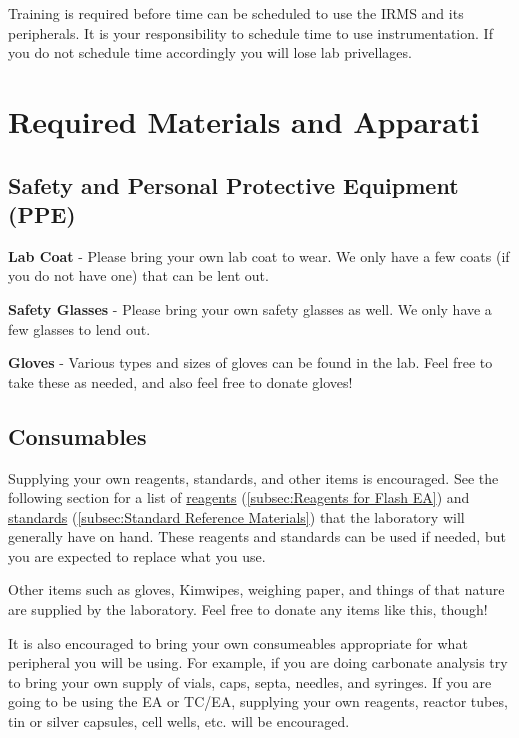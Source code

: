 \documentclass[12pt]{../SOP3}\usepackage[]{graphicx}\usepackage[]{color}
\begin{document}
\NP Training is required before time can be scheduled to use the IRMS and its peripherals. It is your responsibility to schedule time to use instrumentation. If you do not schedule time accordingly you will lose lab privellages.


\section{Required Materials and Apparati}

\subsection{Safety and Personal Protective Equipment (PPE)}

\NP \textbf{Lab Coat} - Please bring your own lab coat to wear. We only have a few coats (if you do not have one) that can be lent out.

\NP \textbf{Safety Glasses} - Please bring your own safety glasses as well. We only have a few glasses to lend out.

\NP \textbf{Gloves} - Various types and sizes of gloves can be found in the lab. Feel free to take these as needed, and also feel free to donate gloves!

\subsection{Consumables}

\NP Supplying your own reagents, standards, and other items is encouraged. See the following section for a list of \hyperref[subsec:Consumeables and Reagents for Flash EA]{reagents} (\ref{subsec:Reagents for Flash EA}) and \hyperref[subsec:Standard Reference Materials]{standards} (\ref{subsec:Standard Reference Materials}) that the laboratory will generally have on hand. These reagents and standards can be used if needed, but you are expected to replace what you use.

\NP Other items such as gloves, Kimwipes, weighing paper, and things of that nature are supplied by the laboratory. Feel free to donate any items like this, though!

\NP It is also encouraged to bring your own consumeables appropriate for what peripheral you will be using. For example, if you are doing carbonate analysis try to bring your own supply of vials, caps, septa, needles, and syringes. If you are going to be using the EA or TC/EA, supplying your own reagents, reactor tubes, tin or silver capsules, cell wells, etc. will be encouraged.
\end{document}
